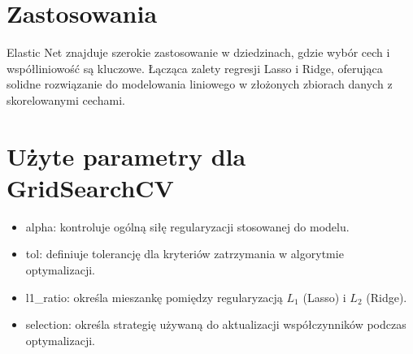{}
\section*{Zastosowania }
\vspace{-1.0em}

\hspace{1.5cm} Elastic Net znajduje szerokie zastosowanie w dziedzinach, gdzie wybór cech i współliniowość są kluczowe. Łącząca zalety regresji Lasso i Ridge, oferująca solidne rozwiązanie do modelowania liniowego w złożonych zbiorach danych z skorelowanymi cechami.


{}
\section*{Użyte parametry dla GridSearchCV \cite{url_ElasticNet, url_grid_search}}
\vspace{-1.0em}

\begin{itemize}
\setlength\itemsep{-0.5em}
 \item  alpha: kontroluje ogólną siłę regularyzacji stosowanej do modelu.
\item tol: definiuje tolerancję dla kryteriów zatrzymania w algorytmie optymalizacji.
\item l1\_ratio: określa mieszankę pomiędzy regularyzacją $L_1$ (Lasso) i $L_2$ (Ridge).
\item selection: określa strategię używaną do aktualizacji współczynników podczas optymalizacji.
\end{itemize}
